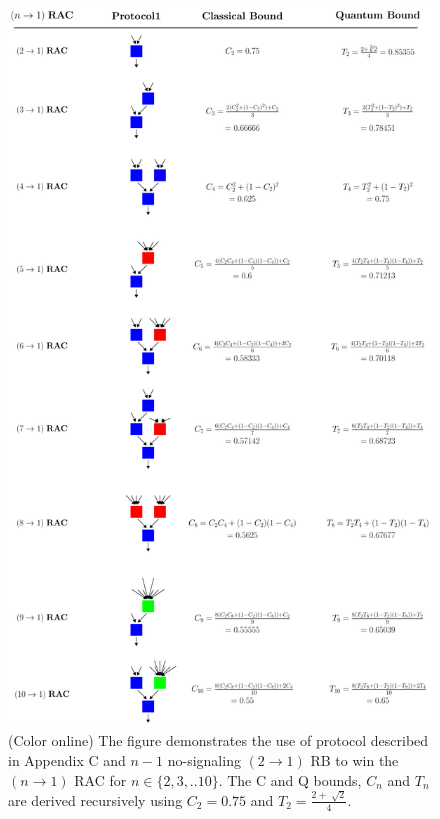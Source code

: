 \begin{figure} 
\includegraphics[scale=0.3]{Protocol.pdf}
\caption{ \label{boundMeToTheGround} (Color online)  The figure demonstrates the use of protocol described in Appendix C and $n-1$ no-signaling $(2\rightarrow1)$ RB to win the $(n\rightarrow1)$ RAC for $n\in \{2,3,..10\}$. The C and Q bounds, $C_n$ and $T_n$ are derived recursively using $C_2=0.75$ and $T_2=\frac{2+\sqrt[]{2}}{4}$.  }
\end{figure}


